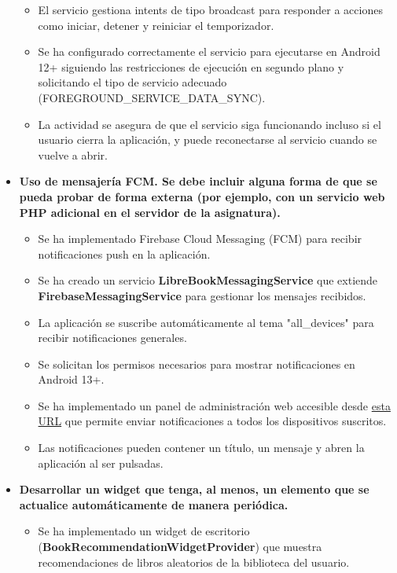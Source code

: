 \documentclass[a4paper,11pt]{report}
\begin{document}
\begin{itemize}
\begin{itemize}
            \item El servicio gestiona intents de tipo broadcast para responder a acciones como iniciar, detener y reiniciar el temporizador.
            \item Se ha configurado correctamente el servicio para ejecutarse en Android 12+ siguiendo las restricciones de ejecución en segundo plano y solicitando el tipo de servicio adecuado (FOREGROUND\_SERVICE\_DATA\_SYNC).
            \item La actividad se asegura de que el servicio siga funcionando incluso si el usuario cierra la aplicación, y puede reconectarse al servicio cuando se vuelve a abrir.
          \end{itemize}
        \item \textbf{Uso de mensajería FCM. Se debe incluir alguna forma de que se pueda probar de forma externa (por ejemplo, con un servicio web PHP adicional en el servidor de la asignatura).}
          \begin{itemize}
            \item Se ha implementado Firebase Cloud Messaging (FCM) para recibir notificaciones push en la aplicación.
            \item Se ha creado un servicio \textbf{LibreBookMessagingService} que extiende \textbf{FirebaseMessagingService} para gestionar los mensajes recibidos.
            \item La aplicación se suscribe automáticamente al tema "all\_devices" para recibir notificaciones generales.
            \item Se solicitan los permisos necesarios para mostrar notificaciones en Android 13+.
            \item Se ha implementado un panel de administración web accesible desde \href{http://ec2-51-44-167-78.eu-west-3.compute.amazonaws.com/xgabina001/WEB/admin_panel.php}{esta URL} que permite enviar notificaciones a todos los dispositivos suscritos.
            \item Las notificaciones pueden contener un título, un mensaje y abren la aplicación al ser pulsadas.
          \end{itemize}
        \item \textbf{Desarrollar un widget que tenga, al menos, un elemento que se actualice automáticamente de manera periódica.}
          \begin{itemize}
            \item Se ha implementado un widget de escritorio (\textbf{BookRecommendationWidgetProvider}) que muestra recomendaciones de libros aleatorios de la biblioteca del usuario.

\end{itemize}
\end{itemize}
\end{document}
